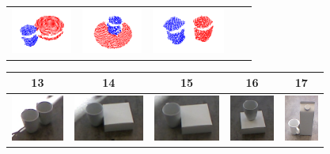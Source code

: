\begin{figure}[h!]
\begin{tabular}{ccccc}
    \includegraphics[height=1.5cm]{pictures/103.png}&
    \includegraphics[height=1.5cm]{pictures/113.png}&
    \includegraphics[height=1.5cm]{pictures/123.png}\\
    \end{tabular}
	\begin{tabular}{ccccc}
      \hline
      13 & 14 & 15 & 16 & 17 \\
      \hline
      \hline
    \includegraphics[height=1.5cm]{pictures/131.jpg}&
    \includegraphics[height=1.5cm]{pictures/141.jpg}& 
    \includegraphics[height=1.5cm]{pictures/151.jpg}&
    \includegraphics[height=1.5cm]{pictures/161.jpg}&
    \includegraphics[height=1.5cm]{pictures/171.jpg}\\    

\end{tabular}
\end{figure}
